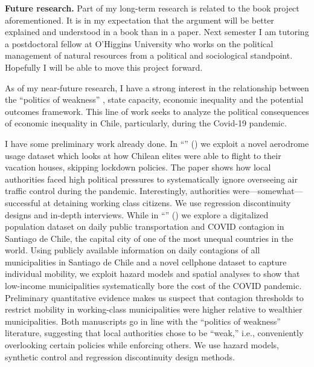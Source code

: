 \documentclass[10pt,stdletter,dateno,sigleft]{newlfm} %
\begin{document}
\begin{newlfm}
{\bf Future research.} Part of my long-term research is related to the book project aforementioned. It is in my expectation that the argument will be better explained and understood in a book than in a paper. Next semester I am tutoring a postdoctoral fellow at O'Higgins University who works on the political management of natural resources from a political and sociological standpoint. Hopefully I will be able to move this project forward. 

As of my near-future research, I have a strong interest in the relationship between the ``politics of weakness'' \parencite{Brinks2020}, state capacity, economic inequality and the potential outcomes framework. This line of work seeks to analyze the political consequences of economic inequality in Chile, particularly, during the Covid-19 pandemic. 

I have some preliminary work already done. In ``\href{https://raw.githubusercontent.com/hbahamonde/Tobalaba/master/abstract.txt}{{\unskip}}'' (\emph{\unskip}) we exploit a novel aerodrome usage dataset which looks at how Chilean elites were able to flight to their vacation houses, skipping lockdown policies. The paper shows how local authorities faced high political pressures to systematically ignore overseeing air traffic control during the pandemic. Interestingly, authorities were---somewhat---successful at detaining working class citizens. We use regression discontinuity designs and in-depth interviews. While in ``\href{https://github.com/hbahamonde/Bus/raw/main/abstract.txt}{{\unskip}}'' (\emph{\unskip})  we explore a digitalized population dataset on daily public transportation and COVID contagion in Santiago de Chile, the capital city of one of the most unequal countries in the world. Using publicly available information on daily contagions of all municipalities in Santiago de Chile and a novel cellphone dataset to capture individual mobility, we exploit hazard models and spatial analyses to show that low-income municipalities systematically bore the cost of the COVID pandemic. Preliminary quantitative evidence makes us suspect that contagion thresholds to restrict mobility in working-class municipalities were higher relative to wealthier municipalities. Both manuscripts go in line with the ``politics of weakness'' literature, suggesting that local authorities chose to be ``weak,'' i.e., conveniently overlooking certain policies while enforcing others. We use hazard models, synthetic control and regression discontinuity design methods.


\end{newlfm}
\end{document}

